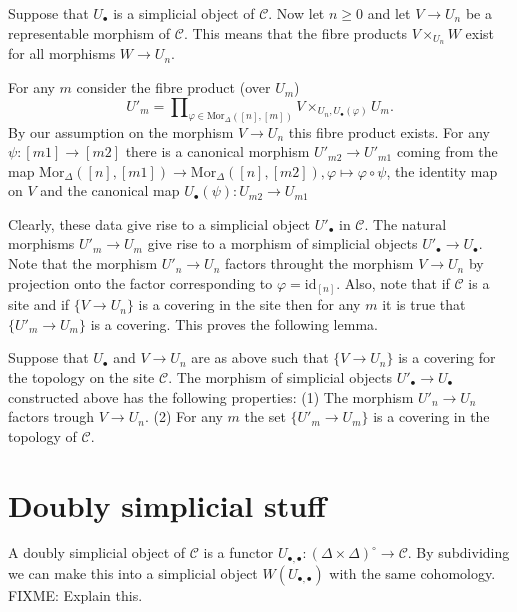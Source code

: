 \noindent
Suppose that $U_\bullet$ is a simplicial object of $\mathcal{C}$. Now let
$n\geq 0$ and let $V \to U_n$ be a representable morphism of 
$\mathcal{C}$. This means that the fibre products $V \times_{U_n} W$ 
exist for all morphisms $W \to U_n$.

\medskip\noindent
For any $m$ consider the fibre product (over $U_m$)
$$
U'_m = \prod\nolimits_{\varphi \in \text{Mor}_\Delta([n],[m])}
V\times_{U_n, U_\bullet(\varphi)} U_m.
$$
By our assumption on the morphism $V \to U_n$ this fibre product
exists. For any $\psi : [m1] \to [m2]$ there is a canonical morphism
$U'_{m2} \to U'_{m1}$ coming from the map $\text{Mor}_\Delta([n],[m1])
\to \text{Mor}_\Delta([n],[m2]), \varphi \mapsto \varphi \circ \psi$,
the identity map on $V$ and the canonical map $U_\bullet(\psi) : 
U_{m2} \to U_{m1}$

\medskip\noindent
Clearly, these data give rise to a simplicial object $U'_\bullet$ in
$\mathcal{C}$. The natural morphisms $U'_m \to U_m$ give rise to a
morphism of simplicial objects $U'_\bullet \to U_\bullet$. Note that
the morphism $U'_n \to U_n$ factors throught the morphism $V \to U_n$
by projection onto the factor corresponding to $\varphi=\text{id}_{[n]}$.
Also, note that if $\mathcal{C}$ is a site and if 
$\{V \to U_n\}$ is a covering in the site then for any $m$ it is true
that $\{U'_m \to U_m\}$ is a covering. This proves the following lemma.

\begin{lemma}
\label{lemma-construct-new-covers}
Suppose that $U_\bullet$ and $V\to U_n$ are as above such that
$\{V \to U_n\}$ is a covering for the topology on the site
$\mathcal{C}$. The morphism of simplicial objects 
$U'_\bullet \to U_\bullet$ constructed above has the following 
properties:
(1) The morphism $U'_n \to U_n$ factors trough $V \to U_n$.
(2) For any $m$ the set $\{U'_m \to U_m\}$ is a covering
in the topology of $\mathcal{C}$.
\end{lemma}

\section{Doubly simplicial stuff}
\label{section-doubly-simplicial}

\noindent
A doubly simplicial object of $\mathcal{C}$ is a functor
$U_{\bullet,\bullet} : (\Delta\times\Delta)^\circ \to \mathcal{C}$.
By subdividing we can make this into a simplicial object 
$W(U_{\bullet,\bullet})$ with the same cohomology. FIXME: Explain this.

